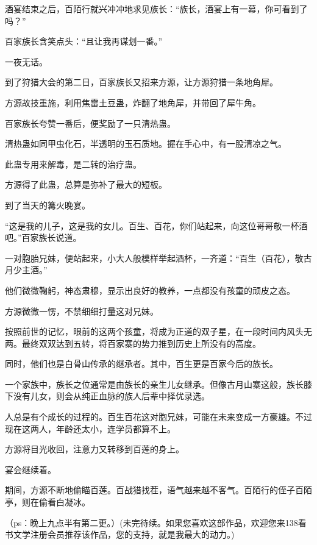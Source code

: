 \begin{this_body}
酒宴结束之后，百陌行就兴冲冲地求见族长：“族长，酒宴上有一幕，你可看到了吗？”

百家族长含笑点头：“且让我再谋划一番。”

一夜无话。

到了狩猎大会的第二日，百家族长又招来方源，让方源狩猎一条地角犀。

方源故技重施，利用焦雷土豆蛊，炸翻了地角犀，并带回了犀牛角。

百家族长夸赞一番后，便奖励了一只清热蛊。

清热蛊如同甲虫化石，半透明的玉石质地。握在手心中，有一股清凉之气。

此蛊专用来解毒，是二转的治疗蛊。

方源得了此蛊，总算是弥补了最大的短板。

到了当天的篝火晚宴。

“这是我的儿子，这是我的女儿。百生、百花，你们站起来，向这位哥哥敬一杯酒吧。”百家族长说道。

一对胞胎兄妹，便站起来，小大人般模样举起酒杯，一齐道：“百生（百花），敬古月少主酒。”

他们微微鞠躬，神态肃穆，显示出良好的教养，一点都没有孩童的顽皮之态。

方源微微一愣，不禁细细打量这对兄妹。

按照前世的记忆，眼前的这两个孩童，将成为正道的双子星，在一段时间内风头无两。最终双双达到五转，将百家寨的势力推到历史上所没有的高度。

同时，他们也是白骨山传承的继承者。其中，百生更是百家今后的族长。

一个家族中，族长之位通常是由族长的亲生儿女继承。但像古月山寨这般，族长膝下没有儿女，则会从纯正血脉的族人后辈中择优录选。

人总是有个成长的过程的。百生百花这对胞兄妹，可能在未来变成一方豪雄。不过现在这两人，年龄还太小，连学员都算不上。

方源将目光收回，注意力又转移到百莲的身上。

宴会继续着。

期间，方源不断地偷瞄百莲。百战猎找茬，语气越来越不客气。百陌行的侄子百陌亭，则在偷看白凝冰。

（ps：晚上九点半有第二更。）(未完待续。如果您喜欢这部作品，欢迎您来138看书文学注册会员推荐该作品，您的支持，就是我最大的动力。)

\end{this_body}

